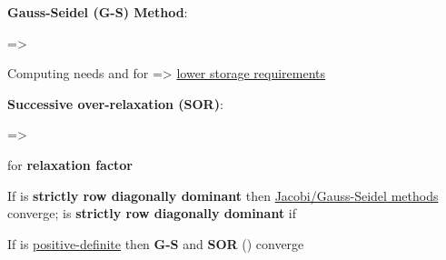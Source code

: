 \hSep %

\textbf{Gauss-Seidel (G-S) Method}:

 => 
\begin{itemize}
      \vItem
      \vItem
            Computing  needs
             and
             for  =>
            \ul{lower storage requirements}
\end{itemize}

\hSep %

\textbf{Successive over-relaxation (SOR)}:

 =>
\begin{itemize}

      \vItem
            for \textbf{relaxation factor} \\
\end{itemize}

\hSep %

If  is \textbf{strictly row diagonally dominant} then \ul{Jacobi/Gauss-Seidel methods} converge;
 is \textbf{strictly row diagonally dominant} if 

If  is \ul{positive-definite} then \textbf{G-S} and \textbf{SOR} () converge
